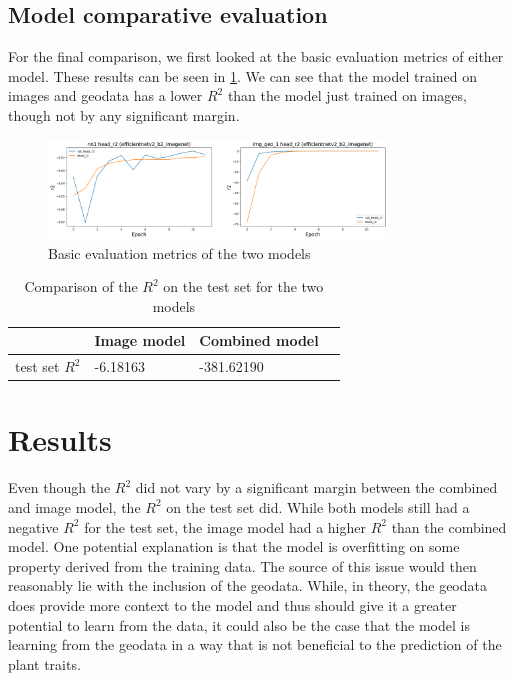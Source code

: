 \documentclass[12pt,a4paper,oneside]{article}
\begin{document}

\subsection{Model comparative evaluation}


For the final comparison, we first looked at the basic evaluation metrics of either model. These results can be seen in \ref{fig:basic_evaluation}. We can see that the model trained on images and geodata has a lower $R^2$ than the model just trained on images, though not by any significant margin. 

\begin{figure}[!h]
    \centering
    \includegraphics[width=0.8\textwidth]{assets/fin_img_vs_geo.png}
    \caption{Basic evaluation metrics of the two models}
    \label{fig:basic_evaluation}
\end{figure}

\begin{table}[!h]
    \centering
    \begin{tabular}{@{}llll@{}}
    \toprule
    & Image model & Combined model \\ \midrule
    test set $R^2$              & -6.18163             & -381.62190   \\ \bottomrule
\end{tabular}
\caption{Comparison of the $R^2$ on the test set for the two models}
\end{table}

\section{Results}

Even though the $R^2$ did not vary by a significant margin between the combined and image model, the $R^2$ on the test set did. While both models still had a negative $R^2$ for the test set, the image model had a higher $R^2$ than the combined model. One potential explanation is that the model is overfitting on some property derived from the training data. The source of this issue would then reasonably lie with the inclusion of the geodata. While, in theory, the geodata does provide more context to the model and thus should give it a greater potential to learn from the data, it could also be the case that the model is learning from the geodata in a way that is not beneficial to the prediction of the plant traits.   
\end{document}
